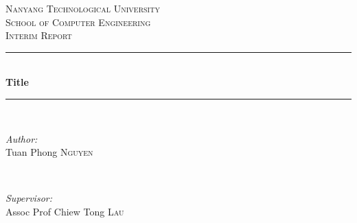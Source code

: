 \begin{titlepage}

\newcommand{\HRule}{\rule{\linewidth}{0.5mm}} %

\center %
 

\textsc{\LARGE Nanyang Technological University}\\[1.5cm] %
\textsc{\Large School of Computer Engineering}\\[0.5cm] %
\textsc{\large Interim Report}\\[0.5cm] %


\HRule \\[0.4cm]
{ \huge \bfseries Title}\\[0.4cm] %
\HRule \\[1.5cm]
 

\begin{minipage}{0.4\textwidth}
\begin{flushleft} \large
\emph{Author:}\\
Tuan Phong \textsc{Nguyen} %
\end{flushleft}
\end{minipage}
~
\begin{minipage}{0.4\textwidth}
\begin{flushright} \large
\emph{Supervisor:} \\
Assoc Prof Chiew Tong \textsc{Lau} %
\end{flushright}
\end{minipage}\\[2cm]



\end{titlepage}
